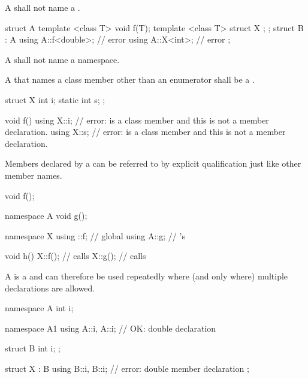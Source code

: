 \pnum
A  shall not name a .
\begin{example}
\begin{codeblock}
struct A {
  template <class T> void f(T);
  template <class T> struct X { };
};
struct B : A {
  using A::f<double>;           // error
  using A::X<int>;              // error
};
\end{codeblock}
\end{example}

\pnum
A  shall not name a namespace.

\pnum
A  that names a class member
other than an enumerator
shall be a
.
\begin{example}
\begin{codeblock}
struct X {
  int i;
  static int s;
};

void f() {
  using X::i;                   // error:  is a class member and this is not a member declaration.
  using X::s;                   // error:  is a class member and this is not a member declaration.
}
\end{codeblock}
\end{example}

\pnum
Members declared by a  can be referred to by
explicit qualification just like other member
names.
\begin{example}
\begin{codeblock}
void f();

namespace A {
  void g();
}

namespace X {
  using ::f;                    // global 
  using A::g;                   // 's 
}

void h()
{
  X::f();                       // calls 
  X::g();                       // calls 
}
\end{codeblock}
\end{example}

\pnum
A  is a  and can
therefore be used repeatedly where (and only where) multiple
declarations are allowed.
\begin{example}
\begin{codeblock}
namespace A {
  int i;
}

namespace A1 {
  using A::i, A::i;             // OK: double declaration
}

struct B {
  int i;
};

struct X : B {
  using B::i, B::i;             // error: double member declaration
};
\end{codeblock}
\end{example}

